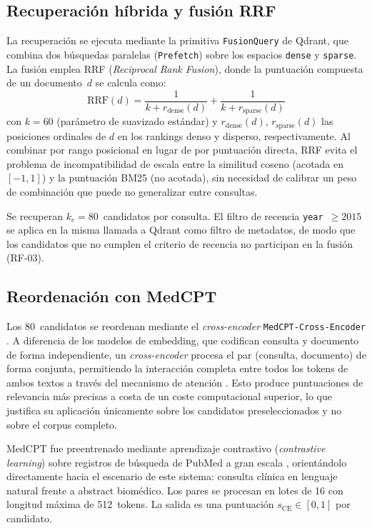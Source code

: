 \documentclass[11pt,a4paper,spanish]{book}
\numberwithin{equation}{chapter}
\numberwithin{figure}{chapter}
\begin{document}
\subsection{Recuperación híbrida y fusión RRF}
\label{sec:c5_rrf}

La recuperación se ejecuta mediante la primitiva \texttt{FusionQuery} de Qdrant, que combina dos búsquedas paralelas (\texttt{Prefetch}) sobre los espacios \texttt{dense} y \texttt{sparse}. La fusión emplea RRF (\textit{Reciprocal Rank Fusion}), donde la puntuación compuesta de un documento~$d$ se calcula como:
\begin{equation}
  \mathrm{RRF}(d) = \frac{1}{k + r_{\text{dense}}(d)} + \frac{1}{k + r_{\text{sparse}}(d)}
\end{equation}
con $k = 60$ (parámetro de suavizado estándar) y $r_{\text{dense}}(d)$, $r_{\text{sparse}}(d)$ las posiciones ordinales de $d$ en los rankings denso y disperso, respectivamente. Al combinar por rango posicional en lugar de por puntuación directa, RRF evita el problema de incompatibilidad de escala entre la similitud coseno (acotada en $[{-1}, 1]$) y la puntuación BM25 (no acotada), sin necesidad de calibrar un peso de combinación que puede no generalizar entre consultas.

Se recuperan $k_c = 80$~candidatos por consulta. El filtro de recencia \texttt{year}~$\geq 2015$ se aplica en la misma llamada a Qdrant como filtro de metadatos, de modo que los candidatos que no cumplen el criterio de recencia no participan en la fusión (RF-03).

\subsection{Reordenación con MedCPT}
\label{sec:c5_medcpt}

Los 80~candidatos se reordenan mediante el \textit{cross-encoder} \texttt{MedCPT-Cross-Encoder} \cite{jin2023medcpt}. A diferencia de los modelos de embedding, que codifican consulta y documento de forma independiente, un \textit{cross-encoder} procesa el par (consulta, documento) de forma conjunta, permitiendo la interacción completa entre todos los tokens de ambos textos a través del mecanismo de atención \cite{vaswani2023attentionneed}. Esto produce puntuaciones de relevancia más precisas a costa de un coste computacional superior, lo que justifica su aplicación únicamente sobre los candidatos preseleccionados y no sobre el corpus completo.

MedCPT fue preentrenado mediante aprendizaje contrastivo (\textit{contrastive learning}) sobre registros de búsqueda de PubMed a gran escala \cite{jin2023medcpt}, orientándolo directamente hacia el escenario de este sistema: consulta clínica en lenguaje natural frente a abstract biomédico. Los pares se procesan en lotes de 16 con longitud máxima de 512~tokens. La salida es una puntuación $s_{\mathrm{CE}} \in [0, 1]$ por candidato.
\end{document}
